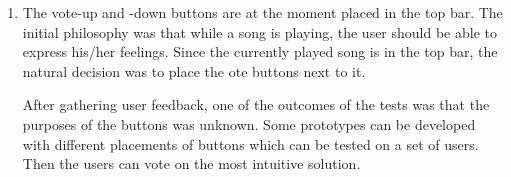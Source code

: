 \begin{enumerate}
\begin{enumerate}
\item The vote-up and -down buttons are at the moment placed in the top bar.
The initial philosophy was that while a song is playing, the user should be able to express his/her feelings.
Since the currently played song is in the top bar, the natural decision was to place the ote buttons next to it.

After gathering user feedback, one of the outcomes of the tests was that the purposes of the buttons was unknown.
Some prototypes can be developed with different placements of buttons which can be tested on a set of users.
Then the users can vote on the most intuitive solution.
\end{enumerate}
\end{enumerate}